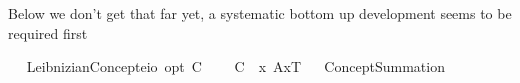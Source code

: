 \begin{isabellebody}
%
\isadelimproof
%
\endisadelimproof
%
\isadelimproof
%
\endisadelimproof
%
\isatagproof
%
\endisatagproof
{\isafoldproof}%
%
\isadelimproof
%
\endisadelimproof
%
\isadelimproof
%
\endisadelimproof
%
\isatagproof
%
\endisatagproof
{\isafoldproof}%
%
\isadelimproof
%
\endisadelimproof
%
\isadelimproof
%
\endisadelimproof
%
\isatagproof
%
\endisatagproof
{\isafoldproof}%
%
\isadelimproof
%
\endisadelimproof
%
\isadelimproof
%
\endisadelimproof
%
\isatagproof
%
\endisatagproof
{\isafoldproof}%
%
\isadelimproof
%
\endisadelimproof
%
\isadelimproof
%
\endisadelimproof
%
\isatagproof
%
\endisatagproof
{\isafoldproof}%
%
\isadelimproof
%
\endisadelimproof
%
\isadelimproof
%
\endisadelimproof
%
\isatagproof
%
\endisatagproof
{\isafoldproof}%
%
\isadelimproof
%
\endisadelimproof
%
\isadelimproof
%
\endisadelimproof
%
\isatagproof
%
\endisatagproof
{\isafoldproof}%
%
\isadelimproof
%
\endisadelimproof
%
\isadelimproof
%
\endisadelimproof
%
\isatagproof
%
\endisatagproof
{\isafoldproof}%
%
\isadelimproof
%
\endisadelimproof
%
\isadelimproof
%
\endisadelimproof
%
\isatagproof
%
\endisatagproof
{\isafoldproof}%
%
\isadelimproof
%
\endisadelimproof
%
\isadelimproof
%
\endisadelimproof
%
\isatagproof
%
\endisatagproof
{\isafoldproof}%
%
\isadelimproof
%
\endisadelimproof
%
\isadelimproof
%
\endisadelimproof
%
\isatagproof
%
\endisatagproof
{\isafoldproof}%
%
\isadelimproof
%
\endisadelimproof
%
\isadelimproof
%
\endisadelimproof
%
\isatagproof
%
\endisatagproof
{\isafoldproof}%
%
\isadelimproof
%
\endisadelimproof
%
\isamarkuptrue%
%
\begin{isamarkuptext}%
Below we don't get that far yet, a systematic bottom up development seems to be required 
  first%
\end{isamarkuptext}%
\isamarkuptrue%
\ \isamarkupfalse%
\ LeibnizianConcept{\isacharcolon}{\isacharcolon}{\isachardoublequoteopen}{\isacharparenleft}e{\isasymRightarrow}io{\isacharparenright}\ opt{\isachardoublequoteclose}\ {\isacharparenleft}{\isachardoublequoteopen}C{\isacharbang}{\isachardoublequoteclose}{\isacharparenright}\ \isanewline
\ \ \ {\isachardoublequoteopen}C{\isacharbang}\ {\isasymequiv}\ \isactrlbold {\isasymlambda}x{\isachardot}\ {\isasymlparr}A{\isacharbang}{\isacharcomma}x\isactrlsup T{\isasymrparr}{\isachardoublequoteclose}\isanewline
\ \isamarkupfalse%
\ ConceptSummation\ {\isacharparenleft}\ {\isachardoublequoteopen}{\isasymOplus}{\isachardoublequoteclose}\ {}{}{}{\isacharparenright}\ \isanewline

\end{isabellebody}

